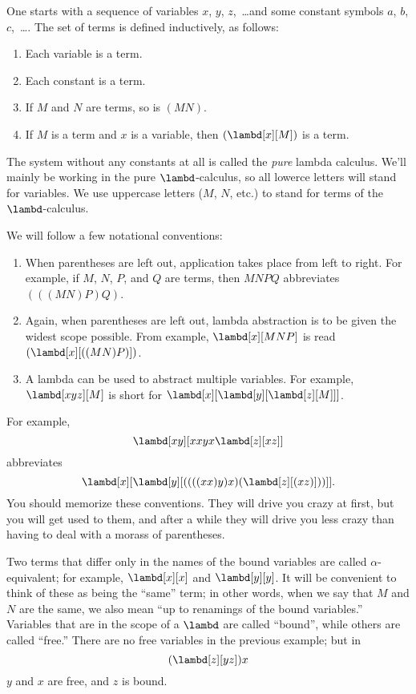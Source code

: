 \documentclass[../../../include/open-logic-section]{subfiles}
\begin{document}

One starts with a sequence of variables $x$, $y$, $z$,~\dots and some
constant symbols $a$, $b$, $c$,~\dots. The set of terms is defined
inductively, as follows:
\begin{enumerate}
\item Each variable is a term.
\item Each constant is a term.
\item If $M$ and $N$ are terms, so is $(MN)$.
\item If $M$ is a term and $x$ is a variable, then $(\lambd[x][M])$ is a
  term.
\end{enumerate}
The system without any constants at all is called the \emph{pure}
lambda calculus. We'll mainly be working in the pure $\lambd$-calculus,
so all lowerce letters will stand for variables. We use uppercase
letters ($M$, $N$, etc.) to stand for terms of the $\lambd$-calculus.

We will follow a few notational conventions:

\begin{conv}
\begin{enumerate}
\item When parentheses are left out, application takes place from left
  to right. For example, if $M$, $N$, $P$, and $Q$ are terms, then
  $MNPQ$ abbreviates $(((MN)P)Q)$.
\item Again, when parentheses are left out, lambda abstraction is to
  be given the widest scope possible. From example, $\lambd[x][MNP]$ is
  read $(\lambd[x][((MN)P)])$.
\item A lambda can be used to abstract multiple variables. For
  example, $\lambd[xyz][M]$ is short for
  $\lambd[x][\lambd[y][\lambd[z][M]]]$.
\end{enumerate}
\end{conv}

For example,
\[
\lambd[xy][xxyx \lambd[z][xz]]
\]
abbreviates
\[
\lambd[x][\lambd[y][((((xx)y)x)(\lambd[z][(xz)]))]].
\]
You should memorize these conventions. They will drive you crazy at
first, but you will get used to them, and after a while they will
drive you less crazy than having to deal with a morass of parentheses.

Two terms that differ only in the names of the bound variables are
called $\alpha$-equivalent; for example, $\lambd[x][x]$ and
$\lambd[y][y]$. It will be convenient to think of these as being the
``same'' term; in other words, when we say that $M$ and $N$ are the
same, we also mean ``up to renamings of the bound variables.''
Variables that are in the scope of a $\lambd$ are called ``bound'',
while others are called ``free.'' There are no free variables in the
previous example; but in
\[
(\lambd[z][yz])x
\]
$y$ and $x$ are free, and $z$ is bound.
\end{document}
